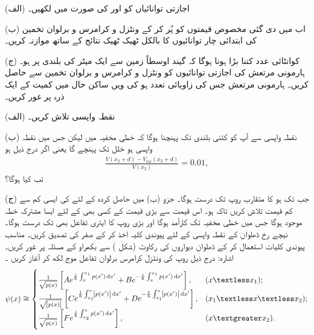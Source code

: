 (الف) اجازتی توانائیاں  کو  اور  کی صورت میں لکھیں۔

(ب) اب  میں دی گئی مخصوص قیمتوں کو پُر کر کے ونٹزل و کرامرس و برلوان  تخمین کی ابتدائی چار توانائیوں کا بالکل ٹھیک ٹھیک نتائج کے ساتھ موازنہ کریں۔

(ج) کوانٹائی عدد  کتنا بڑا ہونا ہوگا کہ گیند اوسطاً زمین سے ایک میٹر کی بلندی پر ہو۔
ہارمونی مرتعش کی اجازتی توانائیوں کو ونٹزل و کرامرس و برلوان  تخمین سے حاصل کریں۔
ہارمونی مرتعش جس کی زاویائی تعدد  ہو کی ویں ساکن حال میں کمیت  کے ایک ذرہ پر غور کریں۔

(الف) نقطہ واپسی  تلاش کریں۔

(ب) نقطہ واپسی سے آپ کو کتنی بلندی  تک پہنچنا ہوگا کہ خطی مخفیہ  میں لیکن جس میں نقطہ واپسی  ہو خلل  تک پہنچے گا یعنی اگر درج ذیل ہو
\begin{align*}
	\frac{V(x_{2}+d)-V_{lin}(x_{2}+d)}{V(x_{2})}=\num{0.01},
\end{align*}
تب  کیا ہوگا؟

(ج) جب تک  ہو  کا متقارب روپ  تک درست ہوگا۔ جزو (ب) میں حاصل کردہ  کے لئے  کی ایسی کم سے کم قیمت تلاش کریں تاکہ  ہو۔ اس قیمت سے بڑی قیمت کے کسی بھی   کے لئے ایسا مشترکہ خطہ موجود ہوگا جس میں خطی مخفیہ  تک کارآمد ہوگا اور بڑی  روپ کا ایئری تفاعل بھی  تک درست ہوگا۔
نیچے رخ ڈھلوان کے نقطہ واپسی کے لئے پیوندی کلیہ اخذ کر کے  صفر کی تصدیق کریں۔
مناسب پیوندی کلیات استعمال کر کے ڈھلوان  دیواروں کی رکاوٹ (شکل ) سے بکھراو کے مسئلہ پر غور کریں۔ اشارہ: درج ذیل روپ کی ونٹزل کرامرس برلوان تفاعل موج لکھ کر آغاز کریں ۔
\begin{align}
	\psi(x)\cong
	\begin{cases}
		\frac{1}{\sqrt{p(x)}}\left[A e^{\frac{i}{\hslash}\int^{x_{1}}_{x}p(x')\dif x'}+B e^{-\frac{i}{\hslash}\int^{x_{1}}_{x}p(x')\dif x'}\right],& (x \textless x_{1}); \\
		\frac{1}{\sqrt{\abs{p(x)}}}\left[C e^{\frac{1}{\hslash}\int^{x}_{x_{1}}\abs{p(x')}\dif x'}+D e^{-\frac{1}{\hslash}\int^{x}_{x_{1}}\abs{p(x')}\dif x'}\right],& (x_{1} \textless x \textless x_{2}); \\
		\frac{1}{\sqrt{p(x)}}\left[F e^{\frac{i}{\hslash}\int^{x}_{x_{2}}p(x')\dif x'}\right],& (x \textgreater x_{2}).
	\end{cases}
\end{align}

